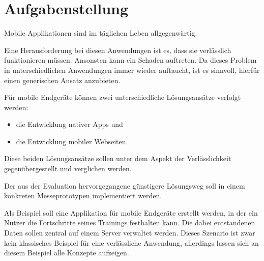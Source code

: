 \chapter*{Aufgabenstellung}
\label{cha:augabenstellung}

Mobile Applikationen sind im täglichen Leben allgegenwärtig.
 
Eine Herausforderung bei diesen Anwendungen ist es, dass sie verlässlich funktionieren müssen. Ansonsten kann ein Schaden auftreten. Da dieses Problem in unterschiedlichen Anwendungen  immer wieder auftaucht, ist es sinnvoll, hierfür einen generischen Ansatz anzubieten. 

Für mobile Endgeräte können zwei unterschiedliche Lösungsansätze verfolgt werden: 
\begin{itemize}
\item die Entwicklung nativer Apps und
\item die Entwicklung mobiler Webseiten.
\end{itemize}
Diese beiden Lösungsansätze sollen unter dem Aspekt der Verlässlichkeit gegenübergestellt und verglichen werden.

Der aus der Evaluation hervorgegangene günstigere Lösungsweg soll in einem konkreten Messeprototypen implementiert werden.

Als Beispiel soll eine Applikation für mobile Endgeräte erstellt werden, in der ein Nutzer die Fortschritte seines Trainings festhalten kann. 
Die dabei entstandenen Daten sollen zentral auf einem Server verwaltet werden. 
Dieses Szenario ist zwar kein klassisches Beispiel für eine verlässliche Anwendung, allerdings lassen sich an diesem Beispiel alle Konzepte aufzeigen.
